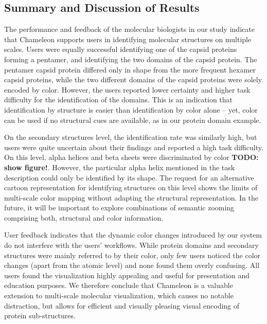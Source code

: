 \documentclass{egpubl}
\begin{document}
\subsection{Summary and Discussion of Results}

The performance and feedback of the molecular biologists in our study indicate that Chameleon supports users in identifying molecular structures on multiple scales. 
Users were equally successful identifying one of the capsid proteins forming a pentamer, and identifying the two domains of the capsid protein. 
The pentamer capsid protein differed only in shape from the more frequent hexamer capsid proteins, while the two different domains of the capsid proteins were solely encoded by color. 
However, the users reported lower certainty and higher task difficulty for the identification of the domains.
This is an indication that identification by structure is easier than identification by color alone -- yet, color can be used if no structural cues are available, as in our protein domain example. 

On the secondary structures level, the identification rate was similarly high, but users were quite uncertain about their findings and reported a high task difficulty. 
On this level, alpha helices and beta sheets were discriminated by color \textbf{TODO: show figure!}. 
However, the particular alpha helix mentioned in the task description could only be identified by its shape. 
The request for an alternative cartoon representation for identifying structures on this level shows the limits of multi-scale color mapping without adapting the structural representation. 
In the future, it will be important to explore combinations of semantic zooming comprising both, structural and color information. 

User feedback indicates that the dynamic color changes introduced by our system do not interfere with the users' workflows. 
While protein domains and secondary structures were mainly referred to by their color, only few users noticed the color changes (apart from the atomic level) and none found them overly confusing. 
All users found the visualization highly appealing and useful for presentation and education purposes. 
We therefore conclude that Chameleon is a valuable extension to multi-scale molecular visualization, which causes no notable distraction, but allows for efficient and visually pleasing visual encoding of protein sub-structures. 
\end{document}
